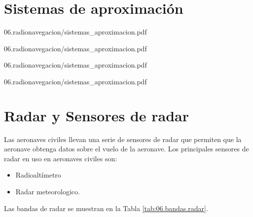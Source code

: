 \section{Sistemas de aproximaci\'on}
\label{sec:06.sistemas.de.aproximacion}


  
  {06.radionavegacion/sistemas_aproximacion.pdf}

  \begin{landscape}
  
{06.radionavegacion/sistemas_aproximacion.pdf}
\end{landscape}

  
  {06.radionavegacion/sistemas_aproximacion.pdf}


  \begin{landscape}
  
{06.radionavegacion/sistemas_aproximacion.pdf}
\end{landscape}


\section{Radar y Sensores de radar}
\label{sec:U06.05.sensores.de.radar}

Las aeronaves civiles llevan una serie de sensores de radar que permiten que la aeronave obtenga datos sobre el vuelo de la aeronave. Los principales sensores de radar en uso en aeronaves civiles son:

\begin{itemize}
\item Radioaltímetro

\item   Radar meteorologico.
\end{itemize}

Las bandas de radar se muestran en la Tabla \ref{tab:06.bandas.radar}.

